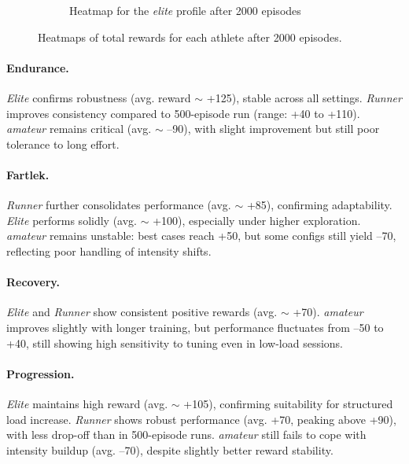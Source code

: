 \begin{figure}
\begin{subfigure}[t]{0.75\textwidth}
        \caption{Heatmap for the \textit{elite} profile after 2000 episodes}
    \label{fig:elite-2000}
    \end{subfigure}
    \caption{Heatmaps of total rewards for each athlete after 2000 episodes.}
\end{figure}
\paragraph{Endurance.}
\textit{Elite} confirms robustness (avg. reward $\sim$ +125), stable across all settings. \textit{Runner} improves consistency compared to 500-episode run (range: +40 to +110). \textit{amateur} remains critical (avg. $\sim$ –90), with slight improvement but still poor tolerance to long effort.

\paragraph{Fartlek.}
\textit{Runner} further consolidates performance (avg. $\sim$ +85), confirming adaptability. \textit{Elite} performs solidly (avg. $\sim$ +100), especially under higher exploration. \textit{amateur} remains unstable: best cases reach +50, but some configs still yield –70, reflecting poor handling of intensity shifts.

\paragraph{Recovery.}
\textit{Elite} and \textit{Runner} show consistent positive rewards (avg. $\sim$ +70). \textit{amateur} improves slightly with longer training, but performance fluctuates from –50 to +40, still showing high sensitivity to tuning even in low-load sessions.

\paragraph{Progression.}
\textit{Elite} maintains high reward (avg. $\sim$ +105), confirming suitability for structured load increase. \textit{Runner} shows robust performance (avg. +70, peaking above +90), with less drop-off than in 500-episode runs. \textit{amateur} still fails to cope with intensity buildup (avg. –70), despite slightly better reward stability.


